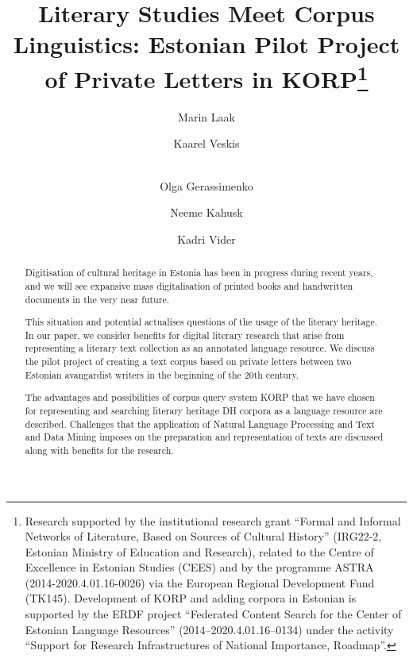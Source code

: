 \documentclass[runningheads]{llncs}
\begin{document}
%
\title{Literary Studies Meet Corpus Linguistics: Estonian Pilot Project of Private Letters in KORP\thanks{Research supported by the institutional research grant ``Formal and Informal Networks of Literature, Based on Sources of Cultural History'' (IRG22-2, Estonian Ministry of Education and Research), related to the Centre of Excellence in Estonian Studies (CEES) and by the programme ASTRA (2014-2020.4.01.16-0026) via the European Regional Development Fund (TK145).  Development of KORP and adding corpora in Estonian is supported by the ERDF project ``Federated Content Search for the Center of Estonian Language Resources'' (2014--2020.4.01.16--0134) under the activity ``Support for Research Infrastructures of National Importance, Roadmap''.}}
%
%
\author{Marin Laak \and Kaarel Veskis \and\\
Olga Gerassimenko \and Neeme Kahusk \and
Kadri Vider}
%
%
%
\maketitle              %
%
\begin{abstract}
  Digitisation of cultural heritage in Estonia has been in progress during recent years, and we will see expansive mass digitalisation of printed books and handwritten documents in the very near future.
  
  This situation and potential actualises questions of the usage of the literary heritage. In our paper, we consider benefits for digital literary research that arise from representing a literary text collection as an annotated language resource. We discuss the pilot project of creating a text corpus based on private letters between two Estonian avangardist writers in the beginning of the 20th century.
  
The advantages and possibilities of corpus query system KORP that we have chosen for representing and searching literary heritage DH corpora as a language resource are described. Challenges that the application of Natural Language Processing and Text and Data Mining imposes on the preparation and representation of texts are discussed along with benefits for the research. 



\end{abstract}
%
%
%
\end{document}

